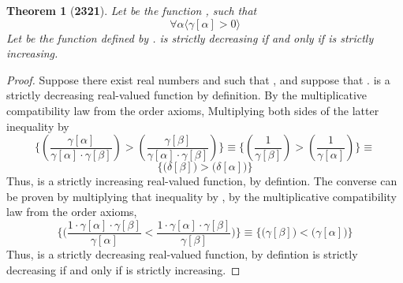 \documentclass[preview]{standalone}
\newtheorem*{theorem*}{Theorem}
\begin{document}
\begin{theorem*}[\textbf{2321}]
    Let \bm{$\gamma$} be the function , such that 
    \begin{equation*}
        \forall \alpha \Big \langle
            \gamma[ \alpha ] > 0 \Big \rangle    
    \end{equation*} 
    Let \bm{$\delta$} be the function  
    defined by . 
    \bm{$\gamma[\alpha]$} is strictly decreasing 
    if and only if 
    \bm{$\delta[\alpha]$} is strictly increasing.
\end{theorem*}

\begin{proof}
    Suppose there exist real numbers \bm{$\alpha$} and \bm{$\beta$} such that 
    \bm{$\alpha < \beta$}, and suppose that 
    \bm{$\gamma[ \alpha ] > \gamma[ \beta ]$}. \bm{$\gamma$} is a strictly decreasing real-valued function by definition. 
    By the multiplicative compatibility law from the order axioms, 
    Multiplying both sides of the latter inequality by 
    \begin{equation*}
        \Bigg\{
            \left(
                \frac{\gamma[\alpha]}{\gamma[\alpha] \cdot \gamma[\beta]}
            \right)
                >
            \left(
                \frac{\gamma[\beta]}{\gamma[\alpha] \cdot \gamma[\beta]}
            \right)  
        \Bigg\}
            \equiv
        \Bigg\{
            \left(
                \frac{1}{\gamma[\beta]}
            \right)
                >
            \left(
                \frac{1}{\gamma[\alpha]}
            \right)
        \Bigg\}
            \equiv
    \end{equation*}
    \begin{equation*}
        \Bigg\{
            \bigg(
                \delta[\beta]
            \bigg)
                >
            \bigg(
                \delta[\alpha]
            \bigg)
        \Bigg\}
    \end{equation*}
    Thus, \bm{$\delta$} is a strictly increasing real-valued function,
    by defintion.
    The converse can be proven by multiplying that inequality
    \bm{$\delta[\alpha] < \delta[\beta]$} by \bm{$\gamma[\alpha]\gamma[\beta]$},
    by the multiplicative compatibility law from the order axioms,
    \begin{equation*}
        \Bigg\{
            \bigg(
                \frac{1 \cdot \gamma[\alpha] \cdot \gamma[\beta]}{\gamma[\alpha]}
                    <
                \frac{1 \cdot \gamma[\alpha] \cdot \gamma[\beta]}{\gamma[\beta]}
            \bigg)
        \Bigg\}
            \equiv
        \Bigg\{
            \bigg(
                \gamma[\beta]
            \bigg)
                <
            \bigg(
                \gamma[\alpha]
            \bigg)
        \Bigg\} 
    \end{equation*}
    Thus, \bm{$\gamma$} is a strictly decreasing real-valued function, by defintion
    \bm{$\therefore \text{\space} \gamma[\alpha]$} is strictly decreasing
    if and only if
    \bm{$\delta[\alpha]$} is strictly increasing.
\color{lightgray} \end{proof}
\end{document}
